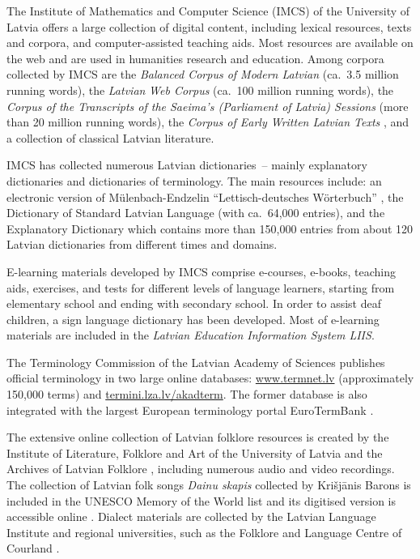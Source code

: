 \begin{multicols}{2}
The Institute of Mathematics and Computer Science (IMCS) of the University of Latvia offers a large collection of digital content, including lexical resources, texts and corpora, and computer-assisted teaching aids.
Most resources are available on the web \cite{Meta7} and are used in humanities research and education.
Among corpora collected by IMCS are the \textit{Balanced Corpus of Modern Latvian} \cite{Meta8} (ca.~3.5 million running words), the \textit{Latvian} \textit{Web Corpus} (ca.~100 million running words), the \textit{Corpus of the Transcripts of the Saeima's (Parliament of Latvia) Sessions} (more than 20 million running words), the \textit{Corpus of Early Written Latvian Texts} \cite{Meta9, metaAndronova}, and a collection of classical Latvian literature.

IMCS has collected numerous Latvian dictionaries~-- mainly explanatory dictionaries and dictionaries of terminology.
The main resources include: an electronic version of Mülenbach-Endzelin ``Lettisch-deutsches Wörterbuch'' \cite{Meta10}, the Dictionary of Standard Latvian Language (with ca.~64,000 entries), and the Explanatory Dictionary which contains more than 150,000 entries from about 120 Latvian dictionaries from different times and domains.

E-learning materials developed by IMCS comprise e-courses, e-books, teaching aids, exercises, and tests for different levels of language learners, starting from elementary school and ending with secondary school.
In order to assist deaf children, a sign language dictionary has been developed.
Most of e-learning materials are included in the \textit{Latvian Education Information System LIIS}.

The Terminology Commission of the Latvian Academy of Sciences publishes official terminology in two large online databases: \url{www.termnet.lv} (approximately 150,000 terms) and \url{termini.lza.lv/akadterm}.
The former database is also integrated with the largest European terminology portal EuroTermBank \cite{Meta61}.

The extensive online collection of Latvian folklore resources is created by the Institute of Literature, Folklore and Art of the University of Latvia and the Archives of Latvian Folklore \cite{Meta11}, including numerous audio and video recordings.
The collection of Latvian folk songs \textit{Dainu skapis} collected by Krišjānis Barons is included in the UNESCO Memory of the World list and its digitised version is accessible online \cite{Meta12}.
Dialect materials are collected by the Latvian Language Institute and regional universities, such as the Folklore and Language Centre of Courland \cite{Meta13}.


\end{multicols}
